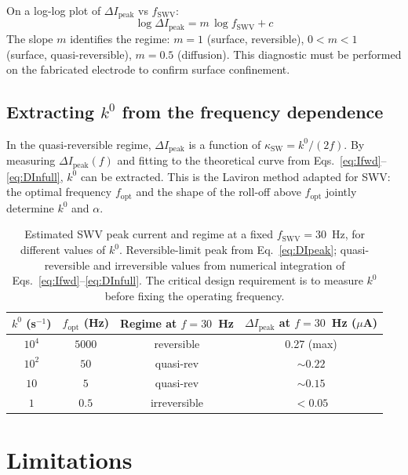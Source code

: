 \documentclass[10pt,a4paper]{article}
\numberwithin{equation}{section}
\newcommand{\DI}{\Delta I}
\begin{document}
On a log-log plot of $\DI_{\text{peak}}$ vs $f_{\text{SWV}}$:
\begin{equation}
  \log \DI_{\text{peak}} = m\,\log f_{\text{SWV}} + c
  \label{eq:loglog}
\end{equation}
The slope $m$ identifies the regime: $m = 1$ (surface, reversible),
$0 < m < 1$ (surface, quasi-reversible), $m = 0.5$ (diffusion).
This diagnostic must be performed on the fabricated electrode to
confirm surface confinement.

\subsection{Extracting $k^0$ from the frequency dependence}

In the quasi-reversible regime, $\DI_{\text{peak}}$ is a function of
$\kappa_{\text{SW}} = k^0/(2f)$. By measuring $\DI_{\text{peak}}(f)$
and fitting to the theoretical curve from Eqs.~\eqref{eq:Ifwd}--\eqref{eq:DInfull},
$k^0$ can be extracted. This is the Laviron method adapted for SWV:
the optimal frequency $f_{\text{opt}}$ and the shape of the roll-off
above $f_{\text{opt}}$ jointly determine $k^0$ and $\alpha$.

\begin{table}[H]
\centering
\small\renewcommand{\arraystretch}{1.25}
\begin{tabular}{@{}cccc@{}}
\toprule
$k^0$ (s$^{-1}$) & $f_{\text{opt}}$ (Hz) & Regime at $f = 30$~Hz &
$\DI_{\text{peak}}$ at $f = 30$~Hz ($\mu$A)\\
\midrule
$10^4$ & $5000$  & reversible & 0.27 (max) \\
$10^2$ & $50$    & quasi-rev  & $\sim 0.22$ \\
$10$   & $5$     & quasi-rev  & $\sim 0.15$ \\
$1$    & $0.5$   & irreversible & $<0.05$ \\
\bottomrule
\end{tabular}
\caption{Estimated SWV peak current and regime at a fixed
$f_{\text{SWV}} = 30$~Hz, for different values of $k^0$.
Reversible-limit peak from Eq.~\eqref{eq:DIpeak}; quasi-reversible
and irreversible values from numerical integration of
Eqs.~\eqref{eq:Ifwd}--\eqref{eq:DInfull}. The critical design
requirement is to measure $k^0$ before fixing the operating frequency.}
\label{tab:freqsweep}
\end{table}

\section{Limitations}
\label{sec:limits}
\end{document}
